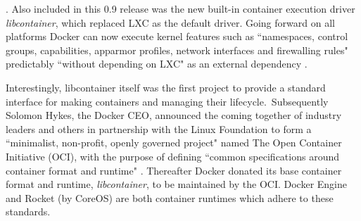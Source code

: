 \documentclass[journal]{IEEEtran}
\begin{document}
\citep{Hykes}.
Also included in this 0.9 release was the new built-in container execution driver \textit{libcontainer}, which replaced LXC as the default driver.
Going forward on all platforms Docker can now execute kernel features such as ``namespaces, control groups, capabilities, apparmor profiles, 
network interfaces and firewalling rules" predictably ``without depending on LXC" as an external dependency \citep{Hykes}. 
\par
Interestingly, libcontainer itself was the first project to provide a standard interface for making containers and managing their lifecycle.\
Subsequently Solomon Hykes, the Docker CEO, announced the coming together of industry leaders and others in partnership with the Linux Foundation
to form a ``minimalist, non-profit, openly governed project" named The Open Container Initiative (OCI), with the purpose of defining 
``common specifications around container format and runtime" \citep{Golub}. 
Thereafter Docker donated its base container format and runtime, \textit{libcontainer}, to be maintained by the OCI. Docker Engine and Rocket (by CoreOS) are both
container runtimes which adhere to these standards. 
\end{document}
